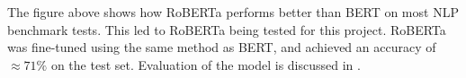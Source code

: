 The figure above shows how RoBERTa performs better than BERT on most NLP benchmark tests. This led to RoBERTa being tested for
this project. RoBERTa was fine-tuned using the same method as BERT, and achieved an accuracy of $\approx 71\%$ on the test set.
Evaluation of the model is discussed in .